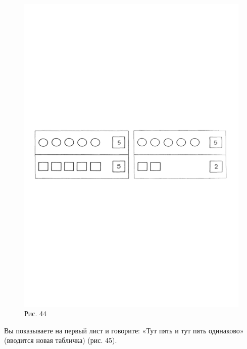 \documentclass[a5paper]{book}
\begin{document}
\begin{figure}
\centering
\includegraphics[width=\linewidth]{media/media/image40.png} Рис. 44
\end{figure}

Вы показываете на первый лист и говорите: «Тут пять и тут пять
одинаково» (вводится новая табличка) (рис. 45).
\end{document}
